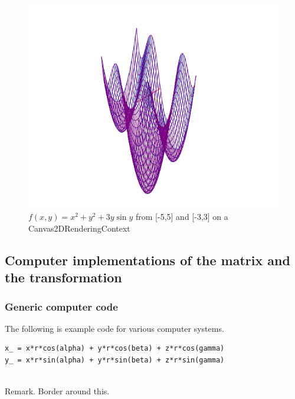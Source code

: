 \documentclass[a4paper]{article}
\begin{document}
\begin{Theorem}
\begin{figure}[ht]
\includegraphics[scale=0.5]{fxyplot.png}
\caption{$f(x,y) = x^2 + y^2 + 3y \sin y$ from [-5,5] and [-3,3] on a Canvas2DRenderingContext}
\end{figure}
\end{Theorem}

\subsection{Computer implementations of the matrix and the transformation}
\subsubsection{Generic computer code}

\begin{example}
The following is example code for various computer systems.\\
\begin{lstlisting}
x_ = x*r*cos(alpha) + y*r*cos(beta) + z*r*cos(gamma)
y_ = x*r*sin(alpha) + y*r*sin(beta) + z*r*sin(gamma)
\end{lstlisting}
\end{example}\\

Remark. Border around this.
\end{document}
